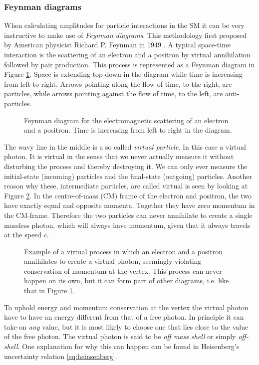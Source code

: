 \subsubsection{Feynman diagrams}
When calculating amplitudes for particle interactions in the SM it can be very instructive to make use of \emph{Feynman diagrams}. This methodology first proposed by American physicist Richard P. Feynman in 1949 \cite{feynman1949sta}. A typical space-time interaction is the scattering of an electron and a positron by virtual annihilation followed by pair production. This process is represented as a Feynman diagram in Figure \ref{fig:feyn:ee_a_ee}. Space is extending top-down in the diagram while time is increasing from left to right. Arrows pointing along the flow of time, to the right, are particles, while arrows pointing against the flow of time, to the left, are anti-particles.
\begin{figure}[htp]
\centering
	
\caption{Feynman diagram for the electromagnetic scattering of an electron and a positron. Time is increasing from left to right in the diagram.} \label{fig:feyn:ee_a_ee}
\end{figure}
The wavy line in the middle is a so called \emph{virtual particle}. In this case a virtual photon. It is virtual in the sense that we never actually measure it without disturbing the process and thereby destroying it. We can only ever measure the initial-state (incoming) particles and the final-state (outgoing) particles. Another reason why these, intermediate particles, are called virtual is seen by looking at Figure \ref{fig:feyn:ee_a}. In the centre-of-mass (CM) frame of the electron and positron, the two have exactly equal and opposite momenta. Together they have zero momentum in the CM-frame. Therefore the two particles can never annihilate to create a single massless photon, which will always have momentum, given that it always travels at the speed $c$. \cite{griffiths1987iep}
\begin{figure}[htp]
\centering
	
\caption{Example of a virtual process in which an electron and a positron annihilates to create a virtual photon, seemingly violating conservation of momentum at the vertex. This process can never happen on its own, but it can form part of other diagrams, i.e. like that in Figure \ref{fig:feyn:ee_a_ee}.} \label{fig:feyn:ee_a}
\end{figure}
To uphold energy and momentum conservation at the vertex the virtual photon have to have an energy different from that of a free photon. In principle it can take on \emph{any} value, but it is most likely to choose one that lies close to the value of the free photon. The virtual photon is said to be \emph{off mass shell} or simply \emph{off-shell}. One explanation for why this can happen can be found in Heisenberg's uncertainty relation \eqref{eq:heinsenberg}.

